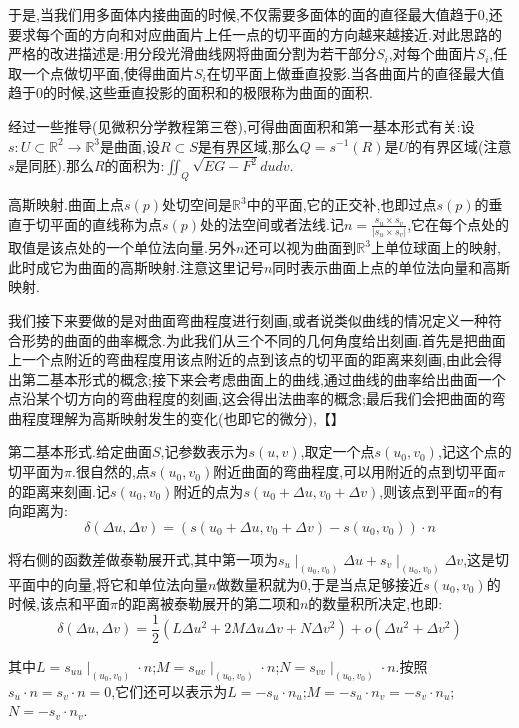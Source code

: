 于是,当我们用多面体内接曲面的时候,不仅需要多面体的面的直径最大值趋于0,还要求每个面的方向和对应曲面片上任一点的切平面的方向越来越接近.对此思路的严格的改进描述是:用分段光滑曲线网将曲面分割为若干部分$S_i$,对每个曲面片$S_i$,任取一个点做切平面,使得曲面片$S_i$在切平面上做垂直投影.当各曲面片的直径最大值趋于0的时候,这些垂直投影的面积和的极限称为曲面的面积.

经过一些推导(见微积分学教程第三卷),可得曲面面积和第一基本形式有关:设$s:U\subset\mathbb{R}^2\to\mathbb{R}^3$是曲面,设$R\subset S$是有界区域,那么$Q=s^{-1}(R)$是$U$的有界区域(注意$s$是同胚).那么$R$的面积为:$\iint_Q\sqrt{EG-F^2}dudv$.

高斯映射.曲面上点$s(p)$处切空间是$\mathbb{R}^3$中的平面,它的正交补,也即过点$s(p)$的垂直于切平面的直线称为点$s(p)$处的法空间或者法线.记$n=\frac{s_u\times s_v}{|s_u\times s_v|}$,它在每个点处的取值是该点处的一个单位法向量.另外$n$还可以视为曲面到$\mathbb{R}^3$上单位球面上的映射,此时成它为曲面的高斯映射.注意这里记号$n$同时表示曲面上点的单位法向量和高斯映射.

我们接下来要做的是对曲面弯曲程度进行刻画,或者说类似曲线的情况定义一种符合形势的曲面的曲率概念.为此我们从三个不同的几何角度给出刻画.首先是把曲面上一个点附近的弯曲程度用该点附近的点到该点的切平面的距离来刻画,由此会得出第二基本形式的概念;接下来会考虑曲面上的曲线,通过曲线的曲率给出曲面一个点沿某个切方向的弯曲程度的刻画,这会得出法曲率的概念;最后我们会把曲面的弯曲程度理解为高斯映射发生的变化(也即它的微分),【】

第二基本形式.给定曲面$S$,记参数表示为$s(u,v)$,取定一个点$s(u_0,v_0)$,记这个点的切平面为$\pi$.很自然的,点$s(u_0,v_0)$附近曲面的弯曲程度,可以用附近的点到切平面$\pi$的距离来刻画.记$s(u_0,v_0)$附近的点为$s(u_0+\Delta u,v_0+\Delta v)$,则该点到平面$\pi$的有向距离为:
$$\delta(\Delta u,\Delta v)=\left(s(u_0+\Delta u,v_0+\Delta v)-s(u_0,v_0)\right)\cdot n$$

将右侧的函数差做泰勒展开式,其中第一项为$s_u\mid_{(u_0,v_0)}\Delta u+s_v\mid_{(u_0,v_0)}\Delta v$,这是切平面中的向量,将它和单位法向量$n$做数量积就为0,于是当点足够接近$s(u_0,v_0)$的时候,该点和平面$\pi$的距离被泰勒展开的第二项和$n$的数量积所决定,也即:
$$\delta(\Delta u,\Delta v)=\frac{1}{2}\left(L\Delta u^2+2M\Delta u\Delta v+N\Delta v^2\right)+o(\Delta u^2+\Delta v^2)$$

其中$L=s_{uu}\mid_{(u_0,v_0)}\cdot n$;$M=s_{uv}\mid_{(u_0,v_0)}\cdot n$;$N=s_{vv}\mid_{(u_0,v_0)}\cdot n$.按照$s_u\cdot n=s_v\cdot n=0$,它们还可以表示为$L=-s_u\cdot n_u$;$M=-s_u\cdot n_v=-s_v\cdot n_u$;$N=-s_v\cdot n_v$.

